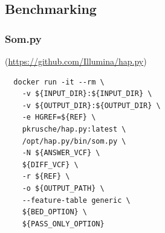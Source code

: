 \documentclass[pdflatex,sn-nature]{sn-jnl}
\begin{document}
\subsection{Benchmarking}
\subsubsection{Som.py}
(\url{https://github.com/Illumina/hap.py})
\label{supp:sompy}
\begin{verbatim}
  docker run -it --rm \
    -v ${INPUT_DIR}:${INPUT_DIR} \
    -v ${OUTPUT_DIR}:${OUTPUT_DIR} \
    -e HGREF=${REF} \
    pkrusche/hap.py:latest \
    /opt/hap.py/bin/som.py \
    -N ${ANSWER_VCF} \
    ${DIFF_VCF} \
    -r ${REF} \
    -o ${OUTPUT_PATH} \
    --feature-table generic \
    ${BED_OPTION} \
    ${PASS_ONLY_OPTION}
\end{verbatim}
\end{document}
